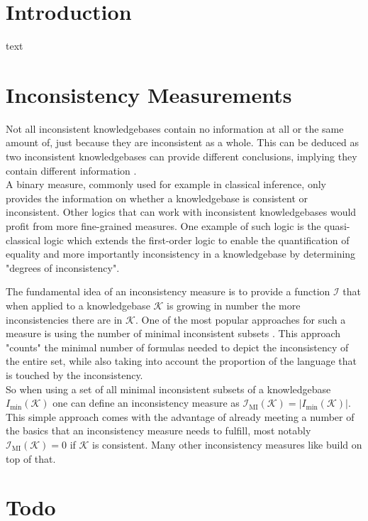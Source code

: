 \section{Introduction}
text

\section{Inconsistency Measurements}
Not all inconsistent knowledgebases contain no information at all or the same amount of, just because they are inconsistent as a whole. This can be deduced as two inconsistent knowledgebases can provide different conclusions, implying they contain different information \cite{bertossi_approaches_2005}.\\
A binary measure, commonly used for example in classical inference, only provides the information on whether a knowledgebase is consistent or inconsistent. Other logics that can work with inconsistent knowledgebases would profit from more fine-grained measures.
One example of such logic is the quasi-classical logic \cite{grant_measuring_2006} which extends the first-order logic to enable the quantification of equality and more importantly inconsistency in a knowledgebase by determining "degrees of inconsistency".

The fundamental idea of an inconsistency measure is to provide a function \(\mathcal{I}\) that when applied to a knowledgebase \(\mathcal{K}\) is growing in number the more inconsistencies there are in \(\mathcal{K}\). One of the most popular approaches for such a measure is using the number of minimal inconsistent subsets \cite{hunter_measuring_2008}. This approach "counts" the minimal number of formulas needed to depict the inconsistency of the entire set, while also taking into account the proportion of the language that is touched by the inconsistency.\\
So when using a set of all minimal inconsistent subsets of a knowledgebase \(I_{\min}(\mathcal{K})\) one can define an inconsistency measure as \(\mathcal{I}_{\text{MI}}(\mathcal{K}) = \left| I_{\min}(\mathcal{K}) \right|\). This simple approach comes with the advantage of already meeting a number of the basics that an inconsistency measure needs to fulfill, most notably \(\mathcal{I}_{\text{MI}}(\mathcal{K}) = 0\) if \(\mathcal{K}\) is consistent.
Many other inconsistency measures like \cite{jabbour_mis_2016} build on top of that.

\section{Todo}
\cite{jabbour_mis_2016}

